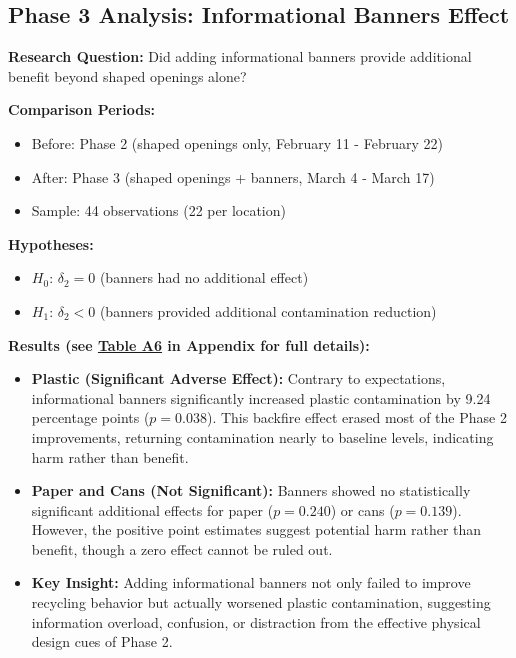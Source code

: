 \documentclass[12pt]{article}
\begin{document}
\subsection{Phase 3 Analysis: Informational Banners Effect}

\textbf{Research Question:} Did adding informational banners provide additional benefit beyond shaped openings alone?

\textbf{Comparison Periods:}
\begin{itemize}
    \item Before: Phase 2 (shaped openings only, February 11 - February 22)
    \item After: Phase 3 (shaped openings + banners, March 4 - March 17)
    \item Sample: 44 observations (22 per location)
\end{itemize}

\textbf{Hypotheses:}
\begin{itemize}
    \item $H_0$: $\delta_2 = 0$ (banners had no additional effect)
    \item $H_1$: $\delta_2 < 0$ (banners provided additional contamination reduction)
\end{itemize}

\textbf{Results (see \hyperref[tab:phase3]{Table A6} in Appendix for full details):}

\begin{itemize}
    \item \textbf{Plastic (Significant Adverse Effect):} Contrary to expectations, informational banners significantly increased plastic contamination by 9.24 percentage points ($p = 0.038$). This backfire effect erased most of the Phase 2 improvements, returning contamination nearly to baseline levels, indicating harm rather than benefit.

    \item \textbf{Paper and Cans (Not Significant):} Banners showed no statistically significant additional effects for paper ($p = 0.240$) or cans ($p = 0.139$). However, the positive point estimates suggest potential harm rather than benefit, though a zero effect cannot be ruled out.

    \item \textbf{Key Insight:} Adding informational banners not only failed to improve recycling behavior but actually worsened plastic contamination, suggesting information overload, confusion, or distraction from the effective physical design cues of Phase 2.
\end{itemize}
\end{document}

